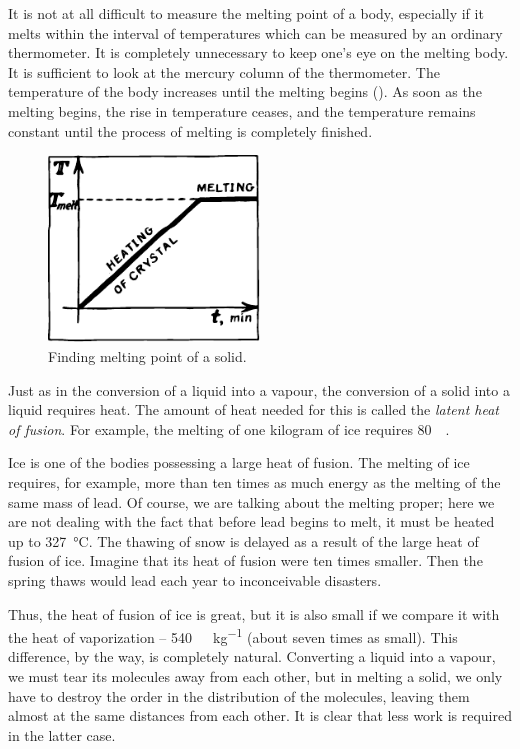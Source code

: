 It is not at all difficult to measure the melting point of a body, especially if it melts within the interval of temperatures which can be measured by an ordinary ther­mometer. It is completely unnecessary to keep one’s eye on the melting body. It is sufficient to look at the mercury column of the thermometer. The temperature of the body increases until the melting begins (). As soon as the melting begins, the rise in temperature
ceases, and the temperature remains constant until the process of melting is completely finished.
\begin{figure}[!ht]
\centering
\includegraphics[width=0.5\textwidth]{figures/fig-04-05.pdf}
\caption{Finding melting point of a solid.}
\label{fig-4.5}
\end{figure}
Just as in the conversion of a liquid into a vapour, the conversion of a solid into a liquid requires heat. The amount of heat needed for this is called the \emph{latent heat of fusion}. For example, the melting of one kilogram of ice requires \SI{80}{\kilo\calorie}.

Ice is one of the bodies possessing a large heat of fusion. The melting of ice requires, for example, more than ten times as much energy as the melting of the same mass of lead. Of course, we are talking about the melting proper; here we are not dealing with the fact that before lead begins to melt, it must be heated up to \SI{+327}{\celsius}. The thawing of snow is delayed as a result of the large heat of fusion of ice. Imagine that its heat of fusion were ten times smaller. Then the spring thaws would lead each year to inconceivable disasters.

Thus, the heat of fusion of ice is great, but it is also small if we compare it with the heat of vaporization -- \SI{540}{\kilo\calorie\per\kilo\gram} (about seven times as small). This difference, by the way, is completely natural. Converting a liquid into a vapour, we must tear its molecules away from each other, but in melting a solid, we only have to destroy the order in the distribution of the molecules, leaving them almost at the same distances from each other. It is clear that less work is required in the latter case.


